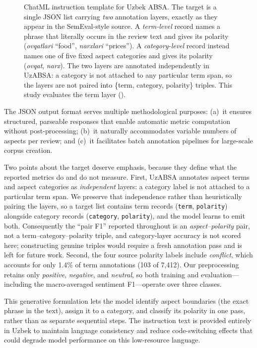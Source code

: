 \documentclass[bdcc,article,submit,moreauthors]{Definitions/mdpi}
\begin{document}
\begin{figure}[t]
\begin{minipage}{0.95\textwidth}
\end{minipage}
\caption{ChatML instruction template for Uzbek ABSA. The target is a single JSON list carrying \emph{two} annotation layers, exactly as they appear in the SemEval-style source. A \emph{term-level} record names a phrase that literally occurs in the review text and gives its polarity (\textit{ovqatlari} ``food'', \textit{narxlari} ``prices''). A \emph{category-level} record instead names one of five fixed aspect categories and gives its polarity (\textit{ovqat}, \textit{narx}). The two layers are annotated independently in UzABSA: a category is not attached to any particular term span, so the layers are not paired into \{term, category, polarity\} triples. This study evaluates the term layer ().}
\label{fig:instruction_example_ui}
\end{figure}

The JSON output format serves multiple methodological purposes: (a)~it ensures structured, parseable responses that enable automatic metric computation without post-processing; (b)~it naturally accommodates variable numbers of aspects per review; and (c)~it facilitates batch annotation pipelines for large-scale corpus creation.

Two points about the target deserve emphasis, because they define what the reported metrics do and do not measure. First, UzABSA annotates aspect terms and aspect categories as \emph{independent} layers: a category label is not attached to a particular term span. We preserve that independence rather than heuristically pairing the layers, so a target list contains term records (\texttt{term}, \texttt{polarity}) alongside category records (\texttt{category}, \texttt{polarity}), and the model learns to emit both. Consequently the ``pair F1'' reported throughout is an \emph{aspect--polarity} pair, not a term--category--polarity triple, and category-layer accuracy is not scored here; constructing genuine triples would require a fresh annotation pass and is left for future work. Second, the four source polarity labels include \textit{conflict}, which accounts for only 1.4\% of term annotations (103 of 7{,}412). Our preprocessing retains only \textit{positive}, \textit{negative}, and \textit{neutral}, so both training and evaluation---including the macro-averaged sentiment F1---operate over three classes.

This generative formulation lets the model identify aspect boundaries (the exact phrase in the text), assign it to a category, and classify its polarity in one pass, rather than as separate sequential steps. The instruction text is provided entirely in Uzbek to maintain language consistency and reduce code-switching effects that could degrade model performance on this low-resource language.
\end{document}
